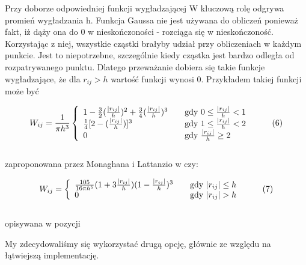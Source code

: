 \documentclass[polish, 12pt]{aghthesis}
\begin{document}
			
			Przy doborze odpowiedniej funkcji wygładzającej W kluczową rolę odgrywa promień wygładzania h. Funkcja Gaussa nie jest używana do obliczeń ponieważ fakt, iż dąży ona do 0 w nieskończoności - rozciąga się w nieskończoność. Korzystając z niej, wszystkie cząstki brałyby udział przy obliczeniach w każdym punkcie. Jest to niepotrzebne, szczególnie kiedy cząstka jest bardzo odległa od rozpatrywanego punktu. Dlatego przeważanie dobiera się takie funkcje wygładzające, że dla ${r_{ij} > h}$ wartość funkcji wynosi 0. Przykładem takiej funkcji może być
			
			\[ W_{ij} = \frac{1}{\pi h^3} \left\{ 
				\begin{array}{l l l}
					1 - \frac{3}{2}(\frac{|r_{ij}|}{h})^2 + \frac{3}{4}(\frac{|r_{ij}|}{h})^3  & \quad \text{gdy ${0 \leq \frac{|r_{ij}|}{h} < 1}$}  \\ 
					\frac{1}{4}[2 - (\frac{|r_{ij}|}{h})]^3  & \quad \text{gdy ${1 \leq \frac{|r_{ij}|}{h} < 2}$}  \\ 
					0 & \quad \text{gdy ${\frac{|r_{ij}|}{h} \geq 2 }$} 
				\end{array} \right.\ \label{eq:kernel_function} \tag{6}\]
			\ \\
			zaproponowana przez Monaghana i Lattanzio w \cite{MonLat} czy:
			
			\[ W_{ij} = \left\{
				\begin{array}{l l}
					\frac{105}{16 \pi h^5}(1 + 3 \frac{|r_{ij}|}{h})(1-\frac{|r_{ij}|}{h})^3 & \quad \text{gdy ${|r_{ij}| \leq h}$}  \\ 0 & \quad \text{gdy ${|r_{ij}| > h}$} 
				\end{array} \right.\ \label{eq:kernel_function} \tag{7}\]
			\ \\
			opisywana w pozycji \cite{Lucy}
			
			My zdecydowaliśmy się wykorzystać drugą opcję, głównie ze względu na łątwiejszą implementację. 
			
\end{document}

